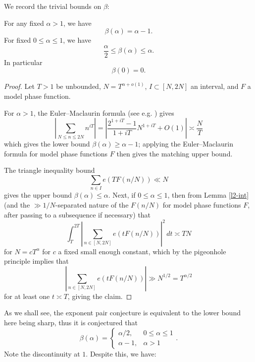 We record the trivial bounds on $\beta$:

\begin{lemma}\label{beta-triv}
\leanok
For any fixed $\alpha > 1$, we have
    $$ \beta(\alpha) = \alpha-1.$$
    For fixed $0 \leq \alpha \leq 1$, we have
    $$ \frac{\alpha}{2} \leq \beta(\alpha) \leq \alpha.$$
    In particular
    \begin{equation}\label{beta-0}
        \beta(0)=0.
    \end{equation}
    \end{lemma}


    \begin{proof}\leanok  Let $T > 1$ be unbounded, $N = T^{\alpha+o(1)}$, $I \subset [N,2N]$ an interval, and $F$ a model phase function.

        For $\alpha > 1$, the Euler--Maclaurin formula (see e.g. \cite[(2.1.2)]{titchmarsh_theory_1986}) gives
        \begin{equation}\label{nit}
            \left|\sum_{N \leq n \leq 2N} n^{iT}\right| = \left|\frac{2^{1+iT} - 1}{1+iT} N^{1+iT} + O(1)\right| \asymp \frac{N}{T}
        \end{equation}
        which gives the lower bound $\beta(\alpha) \geq \alpha-1$; applying the Euler--Maclaurin formula for model phase functions $F$ then gives the matching upper bound.

        The triangle inequality bound
        $$ \sum_{n \in I} e(T F(n/N)) \ll N$$
        gives the upper bound $\beta(\alpha) \leq \alpha$.  Next, if $0 \leq \alpha \leq 1$, then from Lemma \ref{l2-int} (and the $\gg 1/N$-separated nature of the $F(n/N)$ for model phase functions $F$, after passing to a subsequence if necessary) that
        $$ \int_T^{2T} \left|\sum_{n \in [N,2N]} e(t F(n/N)) \right|^2\, dt \asymp T N$$
    for $N = cT^\alpha$ for $c$ a fixed small enough constant, which by the pigeonhole principle implies that
    $$\left| \sum_{n \in [N,2N]}e(t F(n/N)) \right| \gg N^{1/2} = T^{\alpha/2}$$
    for at least one $t \asymp T$, giving the claim.
\end{proof}

As we shall see, the exponent pair conjecture is equivalent to the lower bound here being sharp, thus it is conjectured that
\[
\beta(\alpha) = \begin{cases}
\alpha/2,& 0 \leq \alpha \leq 1\\
\alpha - 1,&\alpha > 1
\end{cases}.
\]
Note the discontinuity at $1$.  Despite this, we have:

